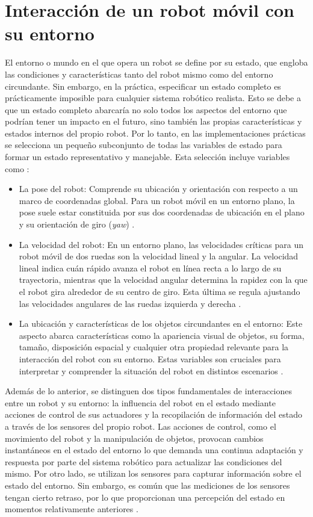 \section{Interacción de un robot móvil con su entorno}
El entorno o mundo en el que opera un robot se define por su estado, que engloba las condiciones y características tanto del robot mismo como del entorno circundante. Sin embargo, en la práctica, especificar un estado completo es prácticamente imposible para cualquier sistema robótico realista. Esto se debe a que un estado completo abarcaría no solo todos los aspectos del entorno que podrían tener un impacto en el futuro, sino también las propias características y estados internos del propio robot. Por lo tanto, en las implementaciones prácticas se selecciona un pequeño subconjunto de todas las variables de estado para formar un estado representativo y manejable. Esta selección incluye variables como \cite{thrun_probabilistic_2005}: 
\begin{itemize}
	\item La pose del robot: Comprende su ubicación y orientación con respecto a un marco de coordenadas global. Para un robot móvil en un entorno plano, la pose suele estar constituida por sus dos coordenadas de ubicación en el plano y su orientación de giro (\textit{yaw}) \cite{thrun_probabilistic_2005}.
	\item La velocidad del robot: En un entorno plano, las velocidades críticas para un robot móvil de dos ruedas son la velocidad lineal y la angular. La velocidad lineal indica cuán rápido avanza el robot en línea recta a lo largo de su trayectoria, mientras que la velocidad angular determina la rapidez con la que el robot gira alrededor de su centro de giro. Esta última se regula ajustando las velocidades angulares de las ruedas izquierda y derecha \cite{thrun_probabilistic_2005}.
	\item La ubicación y características de los objetos circundantes  en el entorno: Este aspecto abarca características como la apariencia visual de objetos, su forma, tamaño, disposición espacial y cualquier otra propiedad relevante para la interacción del robot con su entorno. Estas variables son cruciales para interpretar y comprender la situación del robot en distintos escenarios \cite{thrun_probabilistic_2005}.  
\end{itemize}

Además de lo anterior, se distinguen dos tipos fundamentales de interacciones entre un robot y su entorno: la influencia del robot en el estado mediante acciones de control de sus actuadores y la recopilación de información del estado a través de los sensores del propio robot. Las acciones de control, como el movimiento del robot y la manipulación de objetos, provocan cambios instantáneos en el estado del entorno lo que demanda una continua adaptación y respuesta por parte del sistema robótico para actualizar las condiciones del mismo. Por otro lado, se utilizan los sensores para capturar información sobre el estado del entorno. Sin embargo, es común que las mediciones de los sensores tengan cierto retraso, por lo que proporcionan una percepción del estado en momentos relativamente anteriores \cite{thrun_probabilistic_2005}. 

